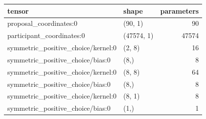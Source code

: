 \begin{tabular}{llr}
\toprule
tensor & shape & parameters \\
\midrule
proposal_coordinates:0 & (90, 1) & 90 \\
participant_coordinates:0 & (47574, 1) & 47574 \\
symmetric_positive_choice/kernel:0 & (2, 8) & 16 \\
symmetric_positive_choice/bias:0 & (8,) & 8 \\
symmetric_positive_choice/kernel:0 & (8, 8) & 64 \\
symmetric_positive_choice/bias:0 & (8,) & 8 \\
symmetric_positive_choice/kernel:0 & (8, 1) & 8 \\
symmetric_positive_choice/bias:0 & (1,) & 1 \\
\bottomrule
\end{tabular}
